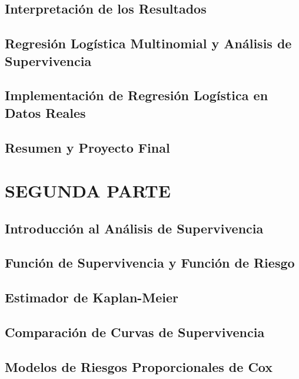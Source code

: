 \documentclass{report}
\begin{document}
\chapter{Interpretaci\'on de los Resultados}


\chapter{Regresi\'on Logística Multinomial y An\'alisis de Supervivencia}


\chapter{Implementaci\'on de Regresi\'on Logística en Datos Reales}


\chapter{Resumen y Proyecto Final}



\part{SEGUNDA PARTE}
\chapter{Introducci\'on al An\'alisis de Supervivencia}


\chapter{Funci\'on de Supervivencia y Funci\'on de Riesgo}


\chapter{Estimador de Kaplan-Meier}


\chapter{Comparaci\'on de Curvas de Supervivencia}


\chapter{Modelos de Riesgos Proporcionales de Cox}

\end{document}
